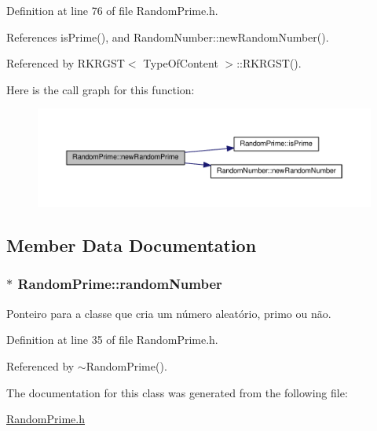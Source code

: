 Definition at line 76 of file Random\+Prime.\+h.



References is\+Prime(), and Random\+Number\+::new\+Random\+Number().



Referenced by R\+K\+R\+G\+S\+T$<$ Type\+Of\+Content $>$\+::\+R\+K\+R\+G\+S\+T().



Here is the call graph for this function\+:\nopagebreak
\begin{figure}[H]
\begin{center}
\leavevmode
\includegraphics[width=350pt]{classRandomPrime_a322ce83f7af45e67d009ff3ed19d0047_cgraph}
\end{center}
\end{figure}




\subsection{Member Data Documentation}
\hypertarget{classRandomPrime_aed4cde44e5f33444c1d0e02d061a6a22}{
\subsubsection[{random\+Number}]{$\ast$ Random\+Prime\+::random\+Number}}\label{classRandomPrime_aed4cde44e5f33444c1d0e02d061a6a22}


Ponteiro para a classe que cria um número aleatório, primo ou não. 



Definition at line 35 of file Random\+Prime.\+h.



Referenced by $\sim$\+Random\+Prime().



The documentation for this class was generated from the following file\+:\begin{DoxyCompactItemize}
\item 
\hyperlink{RandomPrime_8h}{Random\+Prime.\+h}\end{DoxyCompactItemize}
